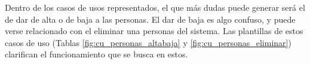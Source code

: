 Dentro de los casos de usos representados, el que más dudas puede generar será el de dar de alta o de baja a las personas. El dar de baja es algo confuso, y puede verse relacionado con el eliminar una personas del sistema. Las plantillas de estos casos de uso (Tablas \ref{fig:cu_personas_altabaja} y \ref{fig:cu_personas_eliminar}) clarifican el funcionamiento que se busca en estos.

\begin{table}[hp!]
    \centering
\end{table}
